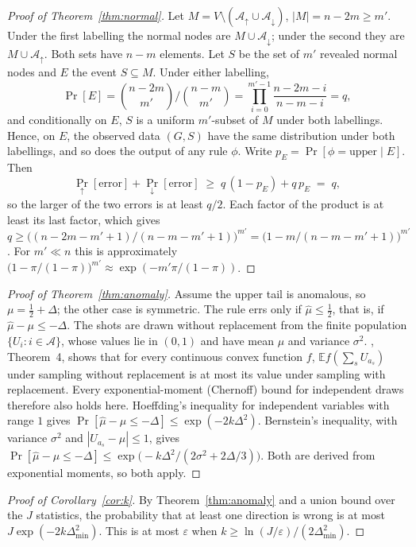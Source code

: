 \begin{proof}[Proof of Theorem~\ref{thm:normal}]
Let $M = V \setminus (\mathcal{A}_\uparrow \cup \mathcal{A}_\downarrow)$, $|M| = n - 2m \ge m'$. Under the first labelling the normal nodes are $M \cup \mathcal{A}_\downarrow$; under the second they are $M \cup \mathcal{A}_\uparrow$. Both sets have $n - m$ elements. Let $S$ be the set of $m'$ revealed normal nodes and $E$ the event $S \subseteq M$. Under either labelling,
\[
\Pr[E] = \binom{n-2m}{m'}\Big/\binom{n-m}{m'} = \prod_{i=0}^{m'-1}\frac{n-2m-i}{n-m-i} = q,
\]
and conditionally on $E$, $S$ is a uniform $m'$-subset of $M$ under both labellings. Hence, on $E$, the observed data $(G, S)$ have the same distribution under both labellings, and so does the output of any rule $\phi$. Write $p_E = \Pr[\phi = \text{upper} \mid E]$. Then
\[
\Pr_{\uparrow}[\text{error}] + \Pr_{\downarrow}[\text{error}]
\;\ge\; q\,(1 - p_E) + q\,p_E \;=\; q,
\]
so the larger of the two errors is at least $q/2$. Each factor of the product is at least its last factor, which gives $q \ge \big((n-2m-m'+1)/(n-m-m'+1)\big)^{m'} = \big(1 - m/(n-m-m'+1)\big)^{m'}$. For $m' \ll n$ this is approximately $\big(1-\pi/(1-\pi)\big)^{m'} \approx \exp(-m'\pi/(1-\pi))$.
\end{proof}

\begin{proof}[Proof of Theorem~\ref{thm:anomaly}]
Assume the upper tail is anomalous, so $\mu = \tfrac12 + \Delta$; the other case is symmetric. The rule errs only if $\hat\mu \le \tfrac12$, that is, if $\hat\mu - \mu \le -\Delta$. The shots are drawn without replacement from the finite population $\{U_i : i \in \mathcal{A}\}$, whose values lie in $(0,1)$ and have mean $\mu$ and variance $\sigma^2$. \citet{hoeffding1963probability}, Theorem~4, shows that for every continuous convex function $f$, $\mathbb{E} f(\sum_s U_{a_s})$ under sampling without replacement is at most its value under sampling with replacement. Every exponential-moment (Chernoff) bound for independent draws therefore also holds here. Hoeffding's inequality for independent variables with range $1$ gives $\Pr[\hat\mu - \mu \le -\Delta] \le \exp(-2k\Delta^2)$. Bernstein's inequality, with variance $\sigma^2$ and $|U_{a_s} - \mu| \le 1$, gives $\Pr[\hat\mu - \mu \le -\Delta] \le \exp\!\big(-k\Delta^2 / (2\sigma^2 + 2\Delta/3)\big)$. Both are derived from exponential moments, so both apply.
\end{proof}

\begin{proof}[Proof of Corollary~\ref{cor:k}]
By Theorem~\ref{thm:anomaly} and a union bound over the $J$ statistics, the probability that at least one direction is wrong is at most $J\exp(-2k\Delta_{\min}^2)$. This is at most $\varepsilon$ when $k \ge \ln(J/\varepsilon)/(2\Delta_{\min}^2)$.
\end{proof}

